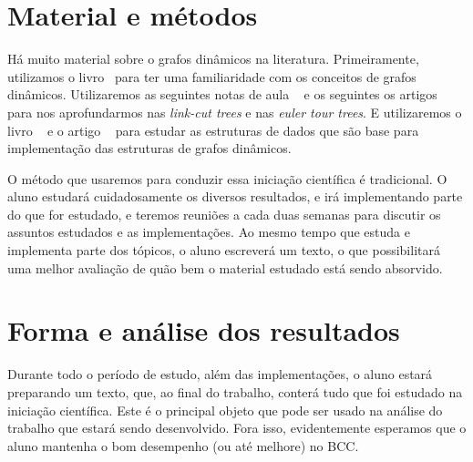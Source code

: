 \documentclass[12pt]{article}
\begin{document}






\section{Material e métodos}

Há muito material sobre o grafos dinâmicos na literatura.
Primeiramente, utilizamos o livro~\cite{DemetrescuFI2004} para ter uma familiaridade com os 
conceitos de grafos dinâmicos. Utilizaremos as seguintes notas de aula ~\cite{DemaineHJSI2012, DemaineL2007} e os seguintes os artigos ~\cite{SleatorT1983, HenzingerK1995} para nos aprofundarmos nas \emph{link-cut trees} e nas \emph{euler tour trees}. 
E utilizaremos o livro ~\cite{SedgewickW2011} e o artigo ~\cite{SleatorT1985} para estudar as estruturas de dados que são base para implementação das estruturas de grafos dinâmicos.

O método que usaremos para conduzir essa iniciação científica é tradicional. 
O aluno estudará cuidadosamente os diversos resultados, e irá implementando 
parte do que for estudado, e teremos reuniões a cada duas semanas para discutir 
os assuntos estudados e as implementações.  Ao mesmo tempo que estuda e implementa
parte dos tópicos, o aluno escreverá um texto, o que possibilitará uma melhor 
avaliação de quão bem o material estudado está sendo absorvido.

\section{Forma e análise dos resultados}

Durante todo o período de estudo, além das implementações, o aluno estará preparando 
um texto, que, ao final do trabalho, conterá tudo que foi estudado na iniciação científica. 
Este é o principal objeto que pode ser usado na análise do trabalho que estará sendo desenvolvido.
Fora isso, evidentemente esperamos que o aluno mantenha o bom desempenho (ou até melhore) no BCC. 



\end{document}
